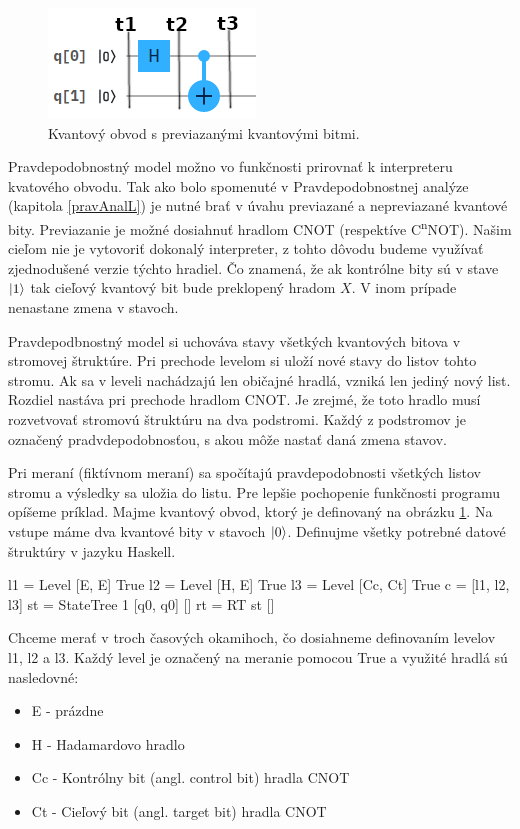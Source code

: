 \begin{figure}
	\centering 
	\includegraphics[width=.4\textwidth]{figures/circuit3.png} 
	\caption{Kvantový obvod s previazanými kvantovými bitmi.}
    \label{obvod}
\end{figure}

Pravdepodobnostný model možno vo funkčnosti prirovnať k interpreteru
kvatového obvodu. Tak ako bolo spomenuté v Pravdepodobnostnej analýze 
(kapitola \ref{pravAnalL}) je nutné brať v úvahu previazané a nepreviazané
kvantové bity. Previazanie je možné dosiahnuť hradlom CNOT (respektíve
C\textsuperscript{n}NOT). Našim cieľom nie je vytovoriť dokonalý interpreter,
z tohto dôvodu budeme využívať zjednodušené verzie týchto hradiel. Čo znamená,
že ak kontrólne bity sú v stave \(\ket{1}\) tak cieľový kvantový bit bude 
preklopený hradom \(X\). V inom prípade nenastane zmena v stavoch.


Pravdepodbnostný model si uchováva stavy všetkých kvantových bitova 
v stromovej štruktúre. Pri prechode levelom si uloží nové stavy do listov
tohto stromu. Ak sa v leveli nachádzajú len običajné hradlá, vzniká len
jediný nový list. Rozdiel nastáva pri prechode hradlom CNOT. Je zrejmé, že 
toto hradlo musí rozvetvovať stromovú štruktúru na dva podstromi. Každý z 
podstromov je označený pradvdepodobnosťou, s akou môže nastať daná zmena 
stavov. 

Pri meraní (fiktívnom meraní) sa spočítajú pravdepodobnosti všetkých listov
stromu a výsledky sa uložia do listu. Pre lepšie pochopenie funkčnosti 
programu opíšeme príklad. Majme kvantový obvod, ktorý je definovaný na 
obrázku \ref{obvod}. Na vstupe máme dva kvantové bity v stavoch \(\ket{0}\).
Definujme všetky potrebné datové štruktúry v jazyku Haskell. 

\begin{code}
l1 = Level [E, E] True
l2 = Level [H, E] True
l3 = Level [Cc, Ct] True
c = [l1, l2, l3]
st = StateTree 1 [q0, q0] []
rt = RT st []
\end{code}

Chceme merať v troch časových okamihoch, čo dosiahneme definovaním levelov
l1, l2 a l3. Každý level je označený na meranie pomocou True a využité hradlá
sú nasledovné:
\begin{itemize}
    \item E - prázdne
    \item H - Hadamardovo hradlo
    \item Cc - Kontrólny bit (angl. control bit) hradla CNOT
    \item Ct - Cieľový bit (angl. target bit) hradla CNOT
\end{itemize}

